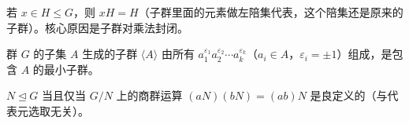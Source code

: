 \begin{proposition}
若 $x \in H \le G$，则 $xH = H$（子群里面的元素做左陪集代表，这个陪集还是原来的子群）。核心原因是子群对乘法封闭。
\end{proposition}

\begin{proposition}[命题 1.26：子集生成群]
群 $G$ 的子集 $A$ 生成的子群 $\langle A \rangle$ 由所有 $a_1^{\varepsilon_1} a_2^{\varepsilon_2} \cdots a_k^{\varepsilon_k}$（$a_i \in A$，$\varepsilon_i = \pm 1$）组成，是包含 $A$ 的最小子群。
\end{proposition}

\begin{proposition}[引理 1.4：正规子群]
$N \trianglelefteq G$ 当且仅当 $G/N$ 上的商群运算 $(aN)(bN) = (ab)N$ 是良定义的（与代表元选取无关）。
\end{proposition}
